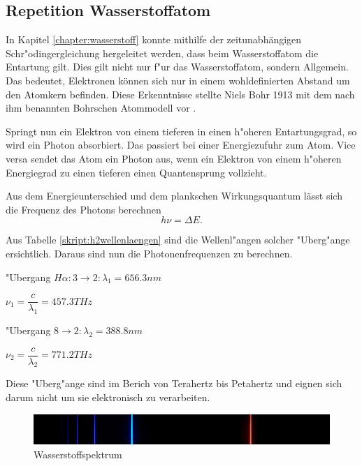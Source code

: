 \begin{refsection}
\subsection{Repetition Wasserstoffatom}
In Kapitel \ref{chapter:wasserstoff} konnte mithilfe der zeitunabhängigen Schr"odingergleichung hergeleitet werden, dass beim Wasserstoffatom die Entartung gilt.
Dies gilt nicht nur f"ur das Wasserstoffatom, sondern Allgemein.
Das bedeutet, Elektronen können sich nur in einem wohldefinierten Abstand um den Atomkern befinden. 
Diese Erkenntnisse stellte Niels Bohr 1913 mit dem nach ihm benannten Bohrschen Atommodell vor \cite{wiki:bohr}. 

Springt nun ein Elektron von einem tieferen in einen h"oheren Entartungsgrad, so wird ein Photon absorbiert.
Das passiert bei einer Energiezufuhr zum Atom. 
Vice versa sendet das Atom ein Photon aus, wenn ein Elektron von einem h"oheren Energiegrad zu einen tieferen einen Quantensprung vollzieht.

Aus dem Energieunterschied und dem plankschen Wirkungsquantum lässt sich die Frequenz des Photons berechnen
\begin{equation}
	h\nu = \varDelta E.
\end{equation}

\vspace{.5cm}

Aus Tabelle \ref{skript:h2wellenlaengen} sind die Wellenl"angen solcher "Uberg"ange ersichtlich. Daraus sind nun die Photonenfrequenzen zu berechnen.

\begin{center}
	"Ubergang $H\alpha: 3 \rightarrow 2: \lambda_1 = 656.3nm$

$\nu_1 = \dfrac{c}{\lambda_1} = 457.3 THz $
\vspace{.5cm}

"Ubergang $8 \rightarrow 2: \lambda_2 = 388.8nm$

$\nu_2 = \dfrac{c}{\lambda_2} = 771.2 THz$
\end{center}	

Diese "Uberg"ange sind im Berich von Terahertz bis Petahertz und eignen sich darum nicht um sie elektronisch zu verarbeiten.

\begin{figure}[h!]
	\centering
	\includegraphics[width = .6\columnwidth]{../vortrag/pictures/wasserstoffSpektrum.jpg}
	\caption{Wasserstoffspektrum} %
\end{figure}



\end{refsection}
